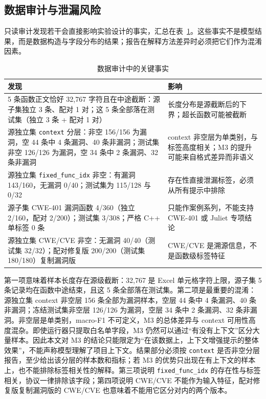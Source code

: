 \documentclass[conference]{IEEEtran}
\begin{document}
\subsection{数据审计与泄漏风险}
只读审计发现若干会直接影响实验设计的事实，汇总在表~\ref{tab:audit}。这些事实不是模型结果，而是数据构造与字段分布的结果；报告在解释方法差异时必须把它们作为混淆因素。

\begin{table}[t]
\caption{数据审计中的关键事实}
\label{tab:audit}
\centering
\small
\begin{tabular}{@{}p{4.6cm}p{3.2cm}@{}}
\toprule
发现 & 影响\\
\midrule
5 条函数正文恰好 32{,}767 字符且在中途截断：源子集独立 3 条、配对 1 对；这 5 条全部落在测试集（独立 3 条 + 配对 1 对） & 长度分布是源截断后的下界；超长函数可能被截断 \\
源独立集 \texttt{context} 分层：非空 156/156 为漏洞，空 44 条中 4 条漏洞、40 条非漏洞；测试集非空 126/126 为漏洞，空 34 条中 2 条漏洞、32 条非漏洞 & context 非空层为单类别，与标签高度相关；M3 的提升可能来自格式差异而非语义 \\
源独立集 \texttt{fixed\_func\_idx} 非空：有漏洞 143/160，无漏洞 0/40；测试集为 115/128 与 0/32 & 存在性直接泄漏标签，必须从所有提示中排除 \\
源子集 CWE-401 漏洞函数 4/360（独立 2/160，配对 2/200）；测试集 3/308；严格 C++ 单标签 0 条 & 只能作案例系列，不能支持 CWE-401 或 Juliet 专项结论 \\
源独立集 CWE/CVE 非空：无漏洞 40/40（测试集 32/32）；配对修复版 200/200（测试集 180/180）复制漏洞版 & CWE/CVE 是溯源信息，不是函数级标签特征 \\
\bottomrule
\end{tabular}
\end{table}

第一项意味着样本长度存在源级截断：32{,}767 是 Excel 单元格字符上限，源子集 5 条记录均在函数中途结束，且这 5 条全部落在测试集。第二项是最重要的混淆：源独立集 context 非空层 156 条全部为漏洞样本，空层 44 条中 4 条漏洞、40 条非漏洞；冻结测试集非空层 126/126 为漏洞，空层 34 条中 2 条漏洞、32 条非漏洞。非空层是单类别，macro-F1 不可定义，M3 的总体差异与 context 可用性高度混杂。即使运行器只提取白名单字段，M3 仍然可以通过“有没有上下文”区分大量样本。因此本文对 M3 的结论只能限定为“在该数据上，上下文增强提示的整体效果”，不能声称模型理解了项目上下文。结果部分必须按 \texttt{context} 是否非空分层报告，至少给出该分层的样本数和指标；若 M3 的优势只出现在有上下文的样本上，也不能排除标签相关性的解释。第三项说明 \texttt{fixed\_func\_idx} 的存在性与标签相关，协议一律排除该字段；第四项说明 CWE/CVE 不能作为输入特征，配对修复版复制漏洞版的 CWE/CVE 也意味着不能用它区分对内的两个版本。
\end{document}
